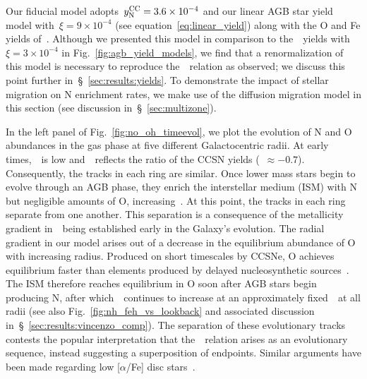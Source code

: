 \documentclass[ms.tex]{subfiles}
\begin{document}
Our fiducial model adopts~$y_\text{N}^\text{CC} = 3.6\times10^{-4}$ and our linear AGB star
yield model with~$\xi = 9\times10^{-4}$ (see equation~\ref{eq:linear_yield})
along with the O and Fe yields of~\citet[][see discussion
in~\S~\ref{sec:yields:ccsne}]{Johnson2021}.
Although we presented this model in comparison to the~\cristallo~yields with
$\xi = 3\times10^{-4}$ in Fig.~\ref{fig:agb_yield_models}, we find that a
renormalization of this model is necessary to reproduce the~\ohno~relation as
observed; we discuss this point further in~\S~\ref{sec:results:yields}.
To demonstrate the impact of stellar migration on N enrichment rates, we make
use of the diffusion migration model in this section (see discussion
in~\S~\ref{sec:multizone}).
\par
In the left panel of Fig.~\ref{fig:no_oh_timeevol}, we plot the evolution of N
and O abundances in the gas phase at five different Galactocentric radii.
At early times,~\oh~is low and~\no~reflects the ratio of the CCSN yields
(\no\subcc~$\approx -0.7$).
Consequently, the tracks in each ring are similar.
Once lower mass stars begin to evolve through an AGB phase, they enrich the
interstellar medium (ISM) with N but negligible amounts of O, increasing~\no.
At this point, the tracks in each ring separate from one another.
This separation is a consequence of the metallicity gradient in~\oh~being
established early in the Galaxy's evolution.
The radial gradient in our model arises out of a decrease in the equilibrium
abundance of O with increasing radius.
Produced on short timescales by CCSNe, O achieves equilibrium faster than
elements produced by delayed nucleosynthetic sources~\citep{Weinberg2017}.
The ISM therefore reaches equilibrium in O soon after AGB stars begin
producing N, after which~\no~continues to increase at an approximately
fixed~\oh~at all radii (see also Fig.~\ref{fig:nh_feh_vs_lookback} and
associated discussion in~\S~\ref{sec:results:vincenzo_comp}).
The separation of these evolutionary tracks contests the popular interpretation
that the~\ohno~relation arises as an evolutionary sequence, instead suggesting
a superposition of endpoints.
Similar arguments have been made regarding low [$\alpha$/Fe] disc
stars~\citep[e.g.][]{Schoenrich2009, Nidever2014, Buck2020, Sharma2021}.
\end{document}
